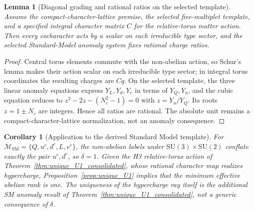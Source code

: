 \documentclass[11pt]{article}
\newtheorem{lemma}[theorem]{Lemma}
\newtheorem{corollary}[theorem]{Corollary}
\theoremstyle{definition}
\newcommand{\SU}{\mathrm{SU}}
\begin{document}
\begin{lemma}[Diagonal grading and rational ratios on the selected template]
\label{lem:A3_derived}
Assume the compact-character-lattice premise, the selected
five-multiplet template, and a specified integral character matrix
$C$ for the relative-torus matter action.  Then every cocharacter acts
by a scalar on each irreducible type sector, and the selected
Standard-Model anomaly system fixes rational charge ratios.
\end{lemma}

\begin{proof}
Central torus elements commute with the non-abelian action, so Schur's
lemma makes their action scalar on each irreducible type sector; in
integral torus coordinates the resulting charges are $Cq$.  On the
selected template, the three linear anomaly equations express
$Y_L,Y_d,Y_e$ in terms of $Y_Q,Y_u$, and the cubic equation reduces to
$z^2-2z-(N_c^2-1)=0$ with $z=Y_u/Y_Q$.  Its roots
$z=1\pm N_c$ are integers.  Hence all ratios are rational.  The
absolute unit remains a compact-character-lattice normalization,
not an anomaly consequence.
\end{proof}

\smallskip\noindent{}
\smallskip

\begin{corollary}[Application to the derived Standard Model template]
\label{cor:unique_U1_SM}
For
$\mathcal M_{\mathrm{SM}}=\{Q,u^c,d^c,L,e^c\}$, the non-abelian
labels under $\SU(3)\times\SU(2)$ conflate exactly the pair
$u^c,d^c$, so $\delta=1$.  Given the H3 relative-torus action of
Theorem~\ref{thm:unique_U1_consolidated}, whose rational character map
realizes hypercharge, Proposition~\ref{prop:unique_U1} implies that the
minimum effective abelian rank is one.  The uniqueness of the
hypercharge ray itself is the additional SM anomaly result of
Theorem~\ref{thm:unique_U1_consolidated}, not a generic consequence of
$\delta$.
\end{corollary}
\end{document}
